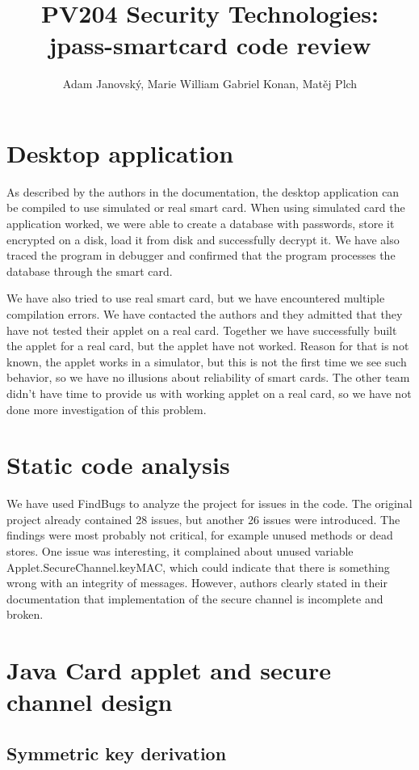 \documentclass[11pt,a4paper]{article}
\title{PV204 Security Technologies: jpass-smartcard code review}
\author{Adam Janovský, Marie William Gabriel Konan, Matěj Plch}
\date{}
\begin{document}
\maketitle

\section*{Desktop application}
As described by the authors in the documentation, the desktop application can be compiled to use simulated or real smart card. When using simulated card the application worked, we were able to create a database with passwords, store it encrypted on a disk, load it from disk and successfully decrypt it. We have also traced the program in debugger and confirmed that the program processes the database through the smart card. 

We have also tried to use real smart card, but we have encountered multiple compilation errors. We have contacted the authors and they admitted that they have not tested their applet on a real card. Together we have successfully built the applet for a real card, but the applet have not worked. Reason for that is not known, the applet works in a simulator, but this is not the first time we see such behavior, so we have no illusions about reliability of smart cards. The other team didn't have time to provide us with working applet on a real card, so we have not done more investigation of this problem.

\section*{Static code analysis}
We have used FindBugs to analyze the project for issues in the code. The original project already contained 28 issues, but another 26 issues were introduced. The findings were most probably not critical, for example unused methods or dead stores. One issue was interesting, it complained about unused variable Applet.SecureChannel.keyMAC, which could indicate that there is something wrong with an integrity of messages. However, authors clearly stated in their documentation that implementation of the secure channel is incomplete and broken.

\section*{Java Card applet and secure channel design}

\subsection*{Symmetric key derivation}
\end{document}
